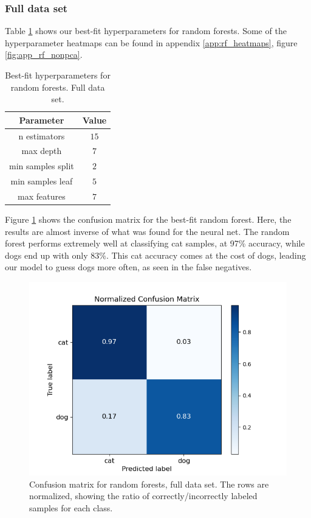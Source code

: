 \documentclass[a4paper]{article}
\begin{document}
\subsubsection{Full data set}
Table \ref{tab:best_fit_rf_nonpca} shows our best-fit hyperparameters for random forests. Some of the hyperparameter heatmaps can be found in appendix \ref{app:rf_heatmaps}, figure \ref{fig:app_rf_nonpca}.
\begin{table}[H]
  \centering
  \caption{Best-fit hyperparameters for random forests. Full data set.}
  \label{tab:best_fit_rf_nonpca}
  \begin{tabular}{c|c}
    \hline\hline
    Parameter & Value\\\hline
    n estimators &  $15$\\
    max depth &  $7$\\
    min samples split & $2$ \\
    min samples leaf  & $5$\\
    max features & $7$ %
    \end{tabular}
\end{table}
Figure \ref{fig:rf_confusion_nonpca} shows the confusion matrix for the best-fit random forest. Here, the results are almost inverse of what was found for the neural net. The random forest performs extremely well at classifying cat samples, at 97\% accuracy, while dogs end up with only 83\%. This cat accuracy comes at the cost of dogs, leading our model to guess dogs more often, as seen in the false negatives.
\begin{figure}[H]
	\centering
	\includegraphics[scale=0.7]{../figures/random_forest/confusion_matrix_nbins200_pca0_seed4155_ts0.20.png}
	\caption{Confusion matrix for random forests, full data set. The rows are normalized, showing the ratio of correctly/incorrectly labeled samples for each class.}
	\label{fig:rf_confusion_nonpca}
\end{figure}	
\end{document}
